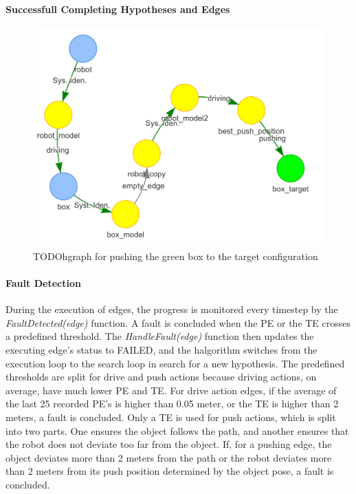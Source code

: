 \paragraph{Successfull Completing Hypotheses and Edges}


\begin{figure}[H]
    \centering
    \includegraphics[width=\textwidth]{figures/proposed_method/connecting_nodes/robot_push/robot_push_9}
    \caption{TODO\ac{hgraph} for pushing the green box to the target configuration}%
    \label{fig:robot_push_4}
\end{figure}


\paragraph{Fault Detection}
During the execution of edges, the progress is monitored every timestep by the \textit{FaultDetected(\gls{edge})} function. A fault is concluded when the \acf{PE} or the \acf{TE} crosses a predefined threshold. The \textit{HandleFault(\gls{edge})} function then updates the executing edge's status to FAILED, and the \ac{halgorithm} switches from the execution loop to the search loop in search for a new hypothesis. The predefined thresholds are split for drive and push actions because driving actions, on average, have much lower \ac{PE} and \ac{TE}. For drive action edges, if the average of the last 25 recorded \ac{PE}'s is higher than 0.05 meter, or the \ac{TE} is higher than 2 meters, a fault is concluded. Only a \ac{TE} is used for push actions, which is split into two parts. One ensures the object follows the path, and another ensures that the robot does not deviate too far from the object. If, for a pushing edge, the object deviates more than 2 meters from the path or the robot deviates more than 2 meters from its push position determined by the object pose, a fault is concluded.\bs

